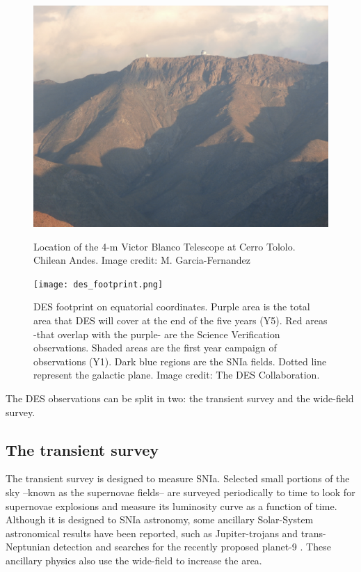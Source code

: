 \begin{figure}
\begin{center}
\includegraphics[width=\textwidth]{./Pictures/cerrotololo_mine.jpg}
\caption{Location of the 4-m Victor Blanco Telescope at Cerro Tololo. Chilean Andes. Image credit: M. Garcia-Fernandez}
\label{fig:cerrotololo}
\vspace{2cm}
\texttt{[image: des\_footprint.png]}
\caption{DES footprint on equatorial coordinates. Purple area is the total area that DES will cover at the end of the five years (Y5). Red areas -that overlap with the purple- are the Science Verification observations. Shaded areas are the first year campaign of observations (Y1). Dark blue regions are the SNIa fields. Dotted line represent the galactic plane. Image credit: The DES Collaboration.}
\label{fig:des_footprint}
\end{center}
\end{figure}

The DES observations can be split in two: the transient survey and the wide-field survey.

\subsection*{The transient survey}
The transient survey is designed to measure SNIa. Selected small portions of the sky --known as the supernovae fields-- are surveyed periodically to time to look for supernovae explosions and measure its luminosity curve as a function of time. Although it is designed to SNIa astronomy, some ancillary Solar-System astronomical results have been reported, such as Jupiter-trojans and trans-Neptunian detection and searches for the recently proposed planet-9 \cite{2016AJ....151...22B}. These ancillary physics also use the wide-field to increase the area.

